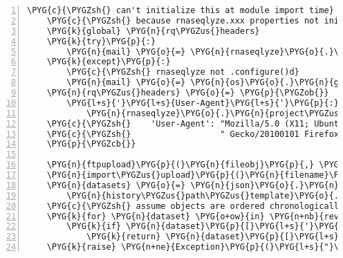 \begin{Verbatim}[commandchars=\\\{\},numbers=left,firstnumber=1,stepnumber=5]
    \PYG{c}{\PYGZsh{} can't initialize this at module import time}
    \PYG{c}{\PYGZsh{} because rnaseqlyze.xxx properties not initialized}
    \PYG{k}{global} \PYG{n}{rq\PYGZus{}headers}
    \PYG{k}{try}\PYG{p}{:}
        \PYG{n}{mail} \PYG{o}{=} \PYG{n}{rnaseqlyze}\PYG{o}{.}\PYG{n}{admin\PYGZus{}email}
    \PYG{k}{except}\PYG{p}{:}
        \PYG{c}{\PYGZsh{} rnaseqlyze not .configure()d}
        \PYG{n}{mail} \PYG{o}{=} \PYG{n}{os}\PYG{o}{.}\PYG{n}{getenv}\PYG{p}{(}\PYG{l+s}{"}\PYG{l+s}{USER}\PYG{l+s}{"}\PYG{p}{)} \PYG{o}{+} \PYG{l+s}{"}\PYG{l+s}{@}\PYG{l+s}{"} \PYG{o}{+} \PYG{n}{os}\PYG{o}{.}\PYG{n}{uname}\PYG{p}{(}\PYG{p}{)}\PYG{p}{[}\PYG{l+m+mi}{1}\PYG{p}{]}
    \PYG{n}{rq\PYGZus{}headers} \PYG{o}{=} \PYG{p}{\PYGZob{}}
        \PYG{l+s}{'}\PYG{l+s}{User-Agent}\PYG{l+s}{'}\PYG{p}{:} \PYG{l+s}{"}\PYG{l+s+si}{\PYGZpc{}s}\PYG{l+s}{ (version:}\PYG{l+s+si}{\PYGZpc{}s}\PYG{l+s}{ / admin:}\PYG{l+s+si}{\PYGZpc{}s}\PYG{l+s}{)}\PYG{l+s}{"} \PYG{o}{\PYGZpc{}} \PYG{p}{(}
            \PYG{n}{rnaseqlyze}\PYG{o}{.}\PYG{n}{project\PYGZus{}name}\PYG{p}{,} \PYG{n}{rnaseqlyze}\PYG{o}{.}\PYG{n}{\PYGZus{}\PYGZus{}version\PYGZus{}\PYGZus{}}\PYG{p}{,} \PYG{n}{mail}\PYG{p}{)}\PYG{p}{,}
    \PYG{c}{\PYGZsh{}    'User-Agent': "Mozilla/5.0 (X11; Ubuntu; Linux x86\PYGZus{}64; rv:13.0)" \PYGZbs{}}
    \PYG{c}{\PYGZsh{}                  " Gecko/20100101 Firefox/13.0.1",}
    \PYG{p}{\PYGZcb{}}

    \PYG{n}{ftpupload}\PYG{p}{(}\PYG{n}{fileobj}\PYG{p}{,} \PYG{n}{filename}\PYG{p}{)}
    \PYG{n}{import\PYGZus{}upload}\PYG{p}{(}\PYG{n}{filename}\PYG{p}{)}
    \PYG{n}{datasets} \PYG{o}{=} \PYG{n}{json}\PYG{o}{.}\PYG{n}{loads}\PYG{p}{(}\PYG{n}{api\PYGZus{}call}\PYG{p}{(}
        \PYG{n}{history\PYGZus{}path\PYGZus{}template}\PYG{o}{.}\PYG{n}{format}\PYG{p}{(}\PYG{n}{history}\PYG{o}{=}\PYG{n}{default\PYGZus{}history}\PYG{p}{)}\PYG{p}{)}\PYG{p}{)}
    \PYG{c}{\PYGZsh{} assume objects are ordered chronologically...}
    \PYG{k}{for} \PYG{n}{dataset} \PYG{o+ow}{in} \PYG{n+nb}{reversed}\PYG{p}{(}\PYG{n}{datasets}\PYG{p}{)}\PYG{p}{:}
        \PYG{k}{if} \PYG{n}{dataset}\PYG{p}{[}\PYG{l+s}{'}\PYG{l+s}{name}\PYG{l+s}{'}\PYG{p}{]} \PYG{o}{==} \PYG{n}{filename}\PYG{p}{:}
            \PYG{k}{return} \PYG{n}{dataset}\PYG{p}{[}\PYG{l+s}{'}\PYG{l+s}{id}\PYG{l+s}{'}\PYG{p}{]}
    \PYG{k}{raise} \PYG{n+ne}{Exception}\PYG{p}{(}\PYG{l+s}{"}\PYG{l+s}{Couldn}\PYG{l+s}{'}\PYG{l+s}{t find id of uploaded file in dataset}\PYG{l+s}{"}\PYG{p}{)}
\end{Verbatim}


